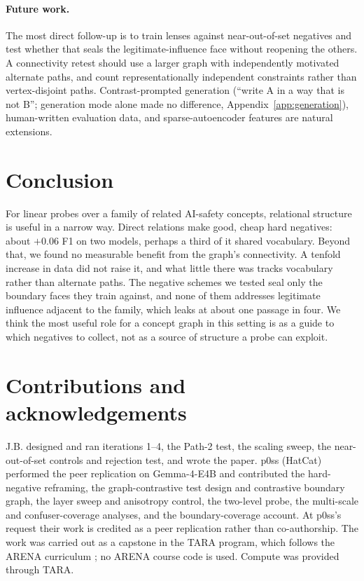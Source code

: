 \documentclass[11pt]{article}
\begin{document}
\paragraph{Future work.} The most direct follow-up is to train lenses against near-out-of-set negatives and test
whether that seals the legitimate-influence face without reopening the others. A connectivity retest should use a
larger graph with independently motivated alternate paths, and count representationally independent constraints
rather than vertex-disjoint paths. Contrast-prompted generation (``write A in a way that is not B''; generation
mode alone made no difference, Appendix~\ref{app:generation}), human-written
evaluation data, and sparse-autoencoder features \citep{lieberum2024gemmascope} are natural extensions.

\section{Conclusion}

For linear probes over a family of related AI-safety concepts, relational structure is useful in a narrow way.
Direct relations make good, cheap hard negatives: about $+0.06$ F1 on two models, perhaps a third of it shared
vocabulary. Beyond that, we found no measurable benefit from the graph's connectivity. A tenfold increase in data
did not raise it, and what little there was tracks vocabulary rather than alternate paths. The negative schemes
we tested seal only the boundary faces they train against, and none of them addresses legitimate influence
adjacent to the family, which leaks at about one passage in four. We think the most useful role for a concept
graph in this setting is as a guide to which negatives to collect, not as a source of structure a probe can
exploit.

\section*{Contributions and acknowledgements}
J.B. designed and ran iterations 1--4, the Path-2 test, the scaling sweep, the near-out-of-set controls and
rejection test, and wrote the paper. p0ss (HatCat) performed the peer replication on Gemma-4-E4B and
contributed the hard-negative reframing, the graph-contrastive test design and contrastive boundary graph, the layer
sweep and anisotropy control, the two-level probe, the multi-scale and confuser-coverage analyses, and the
boundary-coverage account. At p0ss's request their work is credited as a peer replication rather than
co-authorship. The work was carried out as a capstone in the TARA program, which follows the ARENA curriculum
\citep{arena}; no ARENA course code is used. Compute was provided through TARA.
\end{document}
